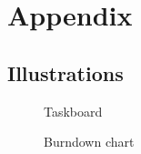 \section*{Appendix}
\renewcommand*\thesubsection{\Roman{subsection}} %
\subsection{Illustrations} \label{illustrations}

\begin{figure}[H]
  \centering
  \caption{Taskboard}
  \label{taskboard}
\end{figure}
\begin{figure}[H]
  \centering
  \caption{Burndown chart}
  \label{burndown}
\end{figure}

